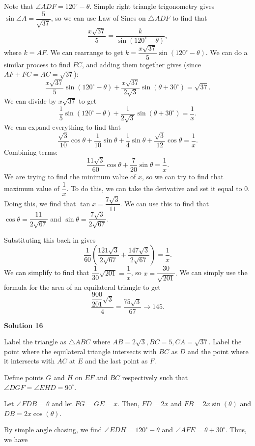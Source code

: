 \begin{enumerate}
 Note that $\angle{ADF}=120^\circ-\theta$. Simple right triangle trigonometry gives $\sin\angle{A}=\dfrac{5}{\sqrt{37}}$, so we can use Law of Sines on $\triangle{ADF}$ to find that
 \[\dfrac{x\sqrt{37}}{5}=\dfrac{k}{\sin(120^\circ-\theta)},\]where $k=AF$. We can rearrange to get $k=\dfrac{x\sqrt{37}}{5}\sin(120^\circ-\theta).$ We can do a similar process to find $FC$, and adding them together gives (since $AF+FC=AC=\sqrt{37}$):
 \[\dfrac{x\sqrt{37}}{5}\sin(120^\circ-\theta)+\dfrac{x\sqrt{37}}{2\sqrt{3}}\sin(\theta+30^\circ)=\sqrt{37}.\]We can divide by $x\sqrt{37}$ to get
 \[\dfrac{1}{5}\sin(120^\circ-\theta)+\dfrac{1}{2\sqrt{3}}\sin(\theta+30^\circ)=\dfrac{1}{x}.\]We can expand everything to find that
 \[\dfrac{\sqrt{3}}{10}\cos\theta+\dfrac{1}{10}\sin\theta+\dfrac{1}{4}\sin\theta+\dfrac{\sqrt{3}}{12}\cos\theta=\dfrac{1}{x}.\]Combining terms:
 \[\dfrac{11\sqrt{3}}{60}\cos\theta+\dfrac{7}{20}\sin\theta=\dfrac{1}{x}.\]We are trying to find the minimum value of $x$, so we can try to find that maximum value of $\dfrac{1}{x}.$ To do this, we can take the derivative and set it equal to $0$. Doing this, we find that $\tan{x}=\dfrac{7\sqrt{3}}{11}.$ We can use this to find that $\cos\theta=\dfrac{11}{2\sqrt{67}}$ and $\sin\theta=\dfrac{7\sqrt{3}}{2\sqrt{67}}$.

 Substituting this back in gives
 \[\dfrac{1}{60}\left(\dfrac{121\sqrt{3}}{2\sqrt{67}}+\dfrac{147\sqrt{3}}{2\sqrt{67}}\right)=\dfrac{1}{x}.\]We can simplify to find that $\dfrac{1}{30}\sqrt{201}=\dfrac{1}{x}$, so $x=\dfrac{30}{\sqrt{201}}.$ We can simply use the formula for the area of an equilateral triangle to get
 \[\dfrac{\dfrac{900}{201}\sqrt{3}}{4}=\dfrac{75\sqrt{3}}{67}\rightarrow \boxed{145}.\]




\textbf{Solution 16}

Label the triangle as $\triangle ABC$ where $AB = 2\sqrt{3}, BC = 5, CA = \sqrt{37}$. Label the point where the equilateral triangle intersects with $BC$ as $D$ and the point where it intersects with $AC$ at $E$ and the last point as $F$. 

 Define points $G$ and $H$ on $EF$ and $BC$ respectively such that $\angle DGF = \angle EHD = 90^{\circ}$. 

 Let $\angle FDB = \theta$ and let $FG = GE = x$. Then, $FD = 2x$ and $FB = 2x\sin(\theta)$ and $DB = 2x\cos(\theta)$. 

 By simple angle chasing, we find $\angle EDH = 120^{\circ} - \theta$ and $\angle AFE = \theta + 30^{\circ}$. Thus, we have


\end{enumerate}
